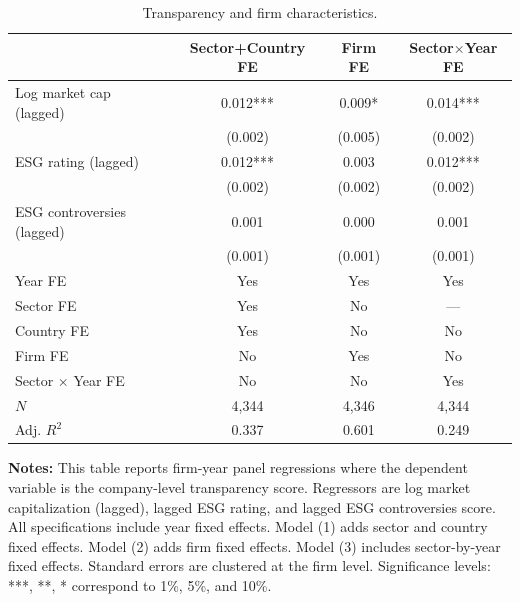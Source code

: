 \begin{table}[!htbp]
\fontsize{9pt}{9pt}\selectfont\renewcommand{\arraystretch}{1.2}
\caption{\label{tab:regression-transp-controls}Transparency and firm characteristics.}
\centering
\begin{threeparttable}

\begin{tabularx}{\textwidth}{ p{5cm} ccc }
\toprule
 & Sector+Country FE & Firm FE & Sector$\times$Year FE \\
\midrule
Log market cap (lagged)    & 0.012*** & 0.009*  & 0.014*** \\
& (0.002)  & (0.005) & (0.002)  \\
ESG rating (lagged)        & 0.012*** & 0.003   & 0.012*** \\
& (0.002)  & (0.002) & (0.002)  \\
ESG controversies (lagged) & 0.001    & 0.000   & 0.001    \\
& (0.001)  & (0.001) & (0.001)  \\
\midrule
Year FE            & Yes & Yes & Yes \\
Sector FE          & Yes & No & --- \\
Country FE         & Yes & No & No \\
Firm FE            & No & Yes & No \\
Sector $\times$ Year FE & No & No & Yes \\
\midrule
$N$               & 4,344 & 4,346 & 4,344 \\
Adj. $R^2$        & 0.337 & 0.601 & 0.249 \\
\bottomrule
\end{tabularx}

\begin{tablenotes}
\scriptsize
\fontsize{10pt}{10pt}\linespread{1.2}\selectfont
\item \textbf{Notes:} This table reports firm-year panel regressions where the dependent variable is the company-level transparency score. Regressors are log market capitalization (lagged), lagged ESG rating, and lagged ESG controversies score. All specifications include year fixed effects. Model (1) adds sector and country fixed effects. Model (2) adds firm fixed effects. Model (3) includes sector-by-year fixed effects. Standard errors are clustered at the firm level. Significance levels: ***, **, * correspond to 1\%, 5\%, and 10\%.
\end{tablenotes}
\end{threeparttable}
\end{table}
